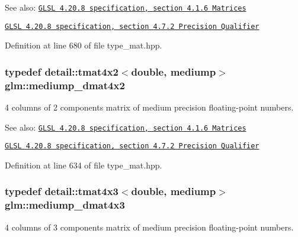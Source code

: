 \begin{Desc}
\item[See also:]\href{http://www.opengl.org/registry/doc/GLSLangSpec.4.20.8.pdf}{\tt GLSL 4.20.8 specification, section 4.1.6 Matrices} 

\href{http://www.opengl.org/registry/doc/GLSLangSpec.4.20.8.pdf}{\tt GLSL 4.20.8 specification, section 4.7.2 Precision Qualifier} \end{Desc}


Definition at line 680 of file type\_\-mat.hpp.\hypertarget{group__core__precision_g03056b616496470371473cd5df4dc1f8}{
\subsubsection[mediump\_\-dmat4x2]{\setlength{\rightskip}{0pt plus 5cm}typedef detail::tmat4x2$<$double, mediump$>$ {\bf glm::mediump\_\-dmat4x2}}}
\label{group__core__precision_g03056b616496470371473cd5df4dc1f8}


4 columns of 2 components matrix of medium precision floating-point numbers.

\begin{Desc}
\item[See also:]\href{http://www.opengl.org/registry/doc/GLSLangSpec.4.20.8.pdf}{\tt GLSL 4.20.8 specification, section 4.1.6 Matrices} 

\href{http://www.opengl.org/registry/doc/GLSLangSpec.4.20.8.pdf}{\tt GLSL 4.20.8 specification, section 4.7.2 Precision Qualifier} \end{Desc}


Definition at line 634 of file type\_\-mat.hpp.\hypertarget{group__core__precision_gfa1ba33d2748737129cde471fedbf9c5}{
\subsubsection[mediump\_\-dmat4x3]{\setlength{\rightskip}{0pt plus 5cm}typedef detail::tmat4x3$<$double, mediump$>$ {\bf glm::mediump\_\-dmat4x3}}}
\label{group__core__precision_gfa1ba33d2748737129cde471fedbf9c5}


4 columns of 3 components matrix of medium precision floating-point numbers.

